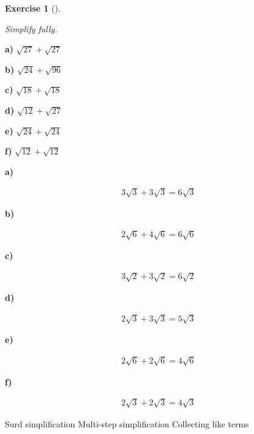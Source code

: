 \documentclass[
  letterpaper,
  DIV=11,
  numbers=noendperiod]{scrreprt}
\theoremstyle{definition}
\newtheorem{exercise}{Exercise}[chapter]
\theoremstyle{remark}
\begin{document}
\begin{exercise}[]\protect\hypertarget{exr-u2-45}{}\label{exr-u2-45}

\emph{Simplify fully.}

\textbf{a)} \(\displaystyle \sqrt{27}+\sqrt{27}\)

\textbf{b)} \(\displaystyle \sqrt{24}+\sqrt{96}\)

\textbf{c)} \(\displaystyle \sqrt{18}+\sqrt{18}\)

\textbf{d)} \(\displaystyle \sqrt{12}+\sqrt{27}\)

\textbf{e)} \(\displaystyle \sqrt{24}+\sqrt{24}\)

\textbf{f)} \(\displaystyle \sqrt{12}+\sqrt{12}\)

\begin{tcolorbox}[enhanced jigsaw, opacitybacktitle=0.6, coltitle=black, arc=.35mm, colframe=quarto-callout-tip-color-frame, colback=white, bottomrule=.15mm, left=2mm, colbacktitle=quarto-callout-tip-color!10!white, titlerule=0mm, opacityback=0, title=\textcolor{quarto-callout-tip-color}{\faLightbulb}\hspace{0.5em}{🔍 View Solutions}, leftrule=.75mm, breakable, rightrule=.15mm, bottomtitle=1mm, toptitle=1mm, toprule=.15mm]

\textbf{a)}

\[
\begin{aligned}
3\sqrt{3}+3\sqrt{3}=6\sqrt{3}
\end{aligned}
\]

\textbf{b)}

\[
\begin{aligned}
2\sqrt{6}+4\sqrt{6}=6\sqrt{6}
\end{aligned}
\]

\textbf{c)}

\[
\begin{aligned}
3\sqrt{2}+3\sqrt{2}=6\sqrt{2}
\end{aligned}
\]

\textbf{d)}

\[
\begin{aligned}
2\sqrt{3}+3\sqrt{3}=5\sqrt{3}
\end{aligned}
\]

\textbf{e)}

\[
\begin{aligned}
2\sqrt{6}+2\sqrt{6}=4\sqrt{6}
\end{aligned}
\]

\textbf{f)}

\[
\begin{aligned}
2\sqrt{3}+2\sqrt{3}=4\sqrt{3}
\end{aligned}
\]

\end{tcolorbox}

{Surd simplification} {Multi-step simplification} {Collecting like
terms}

\end{exercise}
\end{document}
